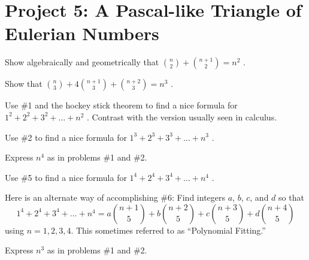 \documentclass[10pt,]{book}
\theoremstyle{plain}
\theoremstyle{definition}
\theoremstyle{definition}
\theoremstyle{definition}
\theoremstyle{definition}
\numberwithin{equation}{chapter}
\begin{document}
\section[{Project 5: A Pascal-like Triangle of Eulerian Numbers}]{Project 5: A Pascal-like Triangle of Eulerian Numbers}\label{exercises-15}
\begin{divisionexercise}{1}\hypertarget{exercise-156}{}
\hypertarget{p-1217}{}%
Show algebraically and geometrically that \(\binom{n}{2}
+
\binom{n + 1}{2}
= n^{2}\) .%
\end{divisionexercise}%
\begin{divisionexercise}{2}\hypertarget{exercise-157}{}
\hypertarget{p-1218}{}%
Show that \(\binom{n}{3}
+ 4
\binom{n + 1}{3}
+
\binom{n + 2}{3}
= n^{3}\) .%
\end{divisionexercise}%
\begin{divisionexercise}{3}\hypertarget{exercise-158}{}
\hypertarget{p-1219}{}%
Use \#1 and the hockey stick theorem to find a nice formula for \(1^{2} + 2^{2} + 3^{2} + \ldots + n^{2}\) . Contrast with the version usually seen in calculus.%
\end{divisionexercise}%
\begin{divisionexercise}{4}\hypertarget{exercise-159}{}
\hypertarget{p-1220}{}%
Use \#2 to find a nice formula for \(1^{3} + 2^{3} + 3^{3} + \ldots + n^{3}\) .%
\end{divisionexercise}%
\begin{divisionexercise}{5}\hypertarget{exercise-160}{}
\hypertarget{p-1221}{}%
Express \(n^{4}\) as in problems \#1 and \#2.%
\end{divisionexercise}%
\begin{divisionexercise}{6}\hypertarget{exercise-161}{}
\hypertarget{p-1222}{}%
Use \#5 to find a nice formula for \(1^{4} + 2^{4} + 3^{4} + \ldots + n^{4}\) .%
\end{divisionexercise}%
\begin{divisionexercise}{7}\hypertarget{exercise-162}{}
\hypertarget{p-1223}{}%
Here is an alternate way of accomplishing \#6:  Find integers \(a\), \(b\), \(c\), and \(d\) so that%
\begin{equation*}
1^{4} + 2^{4} + 3^{4} + \ldots + n^{4} = a\binom{n + 1}{5}  + b\binom{n + 2}{5}  + c\binom{n + 3}{5}  + d\binom{n + 4}{5}
\end{equation*}
using \(n=1, 2, 3, 4\). This sometimes referred to as ``Polynomial Fitting.''%
\end{divisionexercise}%
\begin{divisionexercise}{8}\hypertarget{exercise-163}{}
\hypertarget{p-1224}{}%
Express \(n^{3}\) as in problems \#1 and \#2.%
\end{divisionexercise}%
\end{document}
